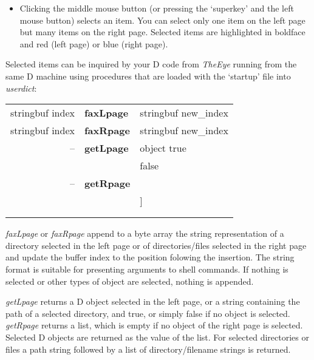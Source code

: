 \begin{description}
\begin{itemize}
\item Clicking the middle mouse button (or pressing the `superkey' and the left mouse button) selects an item. You can select only one item on the left page but many items on the right page. Selected items are highlighted in boldface and red (left page) or blue (right page).
\end{itemize}

Selected items can be inquired by your D code from \emph{TheEye} running from the same D machine using procedures that are loaded with the `startup' file into \emph{userdict}:\\

\begin{tabular}{>{\sffamily}r>{\sffamily\bfseries}l>{\sffamily}l}
stringbuf index & faxLpage & stringbuf new\_index\\
stringbuf index & faxRpage & stringbuf new\_index\\
-- & getLpage & object true\\
   &          & false\\
-- & getRpage & [ D\_object\ldots ]\\
   &          & [ (path) [ (dir/filename)\ldots ]]\\
   &          & [ ]\\\\
\end{tabular}


\emph{faxLpage} or \emph{faxRpage} append to a byte array the string representation of a directory selected in the left page or of directories/files selected in the right page and update the buffer index to the position folowing the insertion. The string format is suitable for presenting arguments to shell commands. If nothing is selected or other types of object are selected, nothing is appended.

\emph{getLpage} returns a D object selected in the left page, or a string containing the path of a selected directory, and true, or simply false if no object is selected. \emph{getRpage} returns a list, which is empty if no object of the right page is selected. Selected D objects are returned as the value of the list. For selected directories or files a path string followed by a list of directory/filename strings is returned. 


 

\end{description}



